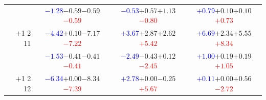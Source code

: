 \documentclass[compress]{beamer}
\begin{document}
\begin{frame}
\begin{tabular}{r | c | c | c}
          & \textcolor{blue}{$-1.28$}\hspace{0.1 cm}$-0.59$\hspace{0.1 cm}$-0.59$\hspace{0.1 cm}\textcolor{red}{$-0.59$} & \textcolor{blue}{$-0.53$}\hspace{0.1 cm}$+0.57$\hspace{0.1 cm}$+1.13$\hspace{0.1 cm}\textcolor{red}{$-0.80$} & \textcolor{blue}{$+0.79$}\hspace{0.1 cm}$+0.10$\hspace{0.1 cm}$+0.10$\hspace{0.1 cm}\textcolor{red}{$+0.73$} \\
$+$1 2 11 & \textcolor{blue}{$-4.42$}\hspace{0.1 cm}$+0.10$\hspace{0.1 cm}$-7.17$\hspace{0.1 cm}\textcolor{red}{$-7.22$} & \textcolor{blue}{$+3.67$}\hspace{0.1 cm}$+2.87$\hspace{0.1 cm}$+2.62$\hspace{0.1 cm}\textcolor{red}{$+5.42$} & \textcolor{blue}{$+6.69$}\hspace{0.1 cm}$+2.34$\hspace{0.1 cm}$+5.55$\hspace{0.1 cm}\textcolor{red}{$+8.34$} \\
          & \textcolor{blue}{$-1.53$}\hspace{0.1 cm}$-0.41$\hspace{0.1 cm}$-0.41$\hspace{0.1 cm}\textcolor{red}{$-0.41$} & \textcolor{blue}{$-2.49$}\hspace{0.1 cm}$-0.43$\hspace{0.1 cm}$+0.12$\hspace{0.1 cm}\textcolor{red}{$-2.45$} & \textcolor{blue}{$+1.00$}\hspace{0.1 cm}$+0.19$\hspace{0.1 cm}$+0.19$\hspace{0.1 cm}\textcolor{red}{$+1.05$} \\
$+$1 2 12 & \textcolor{blue}{$-6.34$}\hspace{0.1 cm}$+0.00$\hspace{0.1 cm}$-8.34$\hspace{0.1 cm}\textcolor{red}{$-7.39$} & \textcolor{blue}{$+2.78$}\hspace{0.1 cm}$+0.00$\hspace{0.1 cm}$-0.25$\hspace{0.1 cm}\textcolor{red}{$+5.67$} & \textcolor{blue}{$+0.11$}\hspace{0.1 cm}$+0.00$\hspace{0.1 cm}$+0.56$\hspace{0.1 cm}\textcolor{red}{$-2.72$} \\

\end{tabular}
\end{frame}
\end{document}
